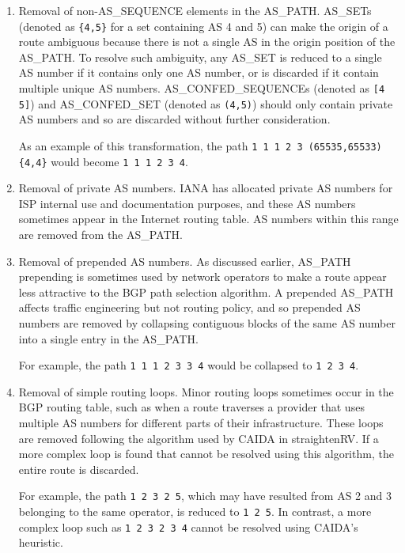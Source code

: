 \begin{enumerate}
\item{Removal of non-AS\_SEQUENCE elements in the AS\_PATH. AS\_SETs (denoted as \verb!{4,5}! for a set containing AS 4 and 5) can make the origin of a route ambiguous because there is not a single AS in the origin position of the AS\_PATH. To resolve such ambiguity, any AS\_SET is reduced to a single AS number if it contains only one AS number, or is discarded if it contain multiple unique AS numbers. AS\_CONFED\_SEQUENCEs (denoted as \verb![4 5]!) and AS\_CONFED\_SET (denoted as \verb!(4,5)!) should only contain private AS numbers and so are discarded without further consideration.

As an example of this transformation, the path \verb!1 1 1 2 3 (65535,65533) {4,4}! would become \verb!1 1 1 2 3 4!.
}

\item{Removal of private AS numbers. IANA has allocated private AS numbers \cite{IANA AS number list} for ISP internal use and documentation purposes, and these AS numbers sometimes appear in the Internet routing table. AS numbers within this range are removed from the AS\_PATH.}

\item{Removal of prepended AS numbers. As discussed earlier, AS\_PATH prepending is sometimes used by network operators to make a route appear less attractive to the BGP path selection algorithm. A prepended AS\_PATH affects traffic engineering but not routing policy, and so prepended AS numbers are removed by collapsing contiguous blocks of the same AS number into a single entry in the AS\_PATH.

For example, the path \verb!1 1 1 2 3 3 4! would be collapsed to \verb!1 2 3 4!.}
\item{Removal of simple routing loops. Minor routing loops sometimes occur in the BGP routing table, such as when a route traverses a provider that uses multiple AS numbers for different parts of their infrastructure. These loops are removed following the algorithm used by CAIDA in straightenRV\cite{straightenrv}. If a more complex loop is found that cannot be resolved using this algorithm, the entire route is discarded.

For example, the path \verb!1 2 3 2 5!, which may have resulted from AS 2 and 3 belonging to the same operator, is reduced to \verb!1 2 5!. In contrast, a more complex loop such as \verb!1 2 3 2 3 4! cannot be resolved using CAIDA's heuristic.}
\end{enumerate}

